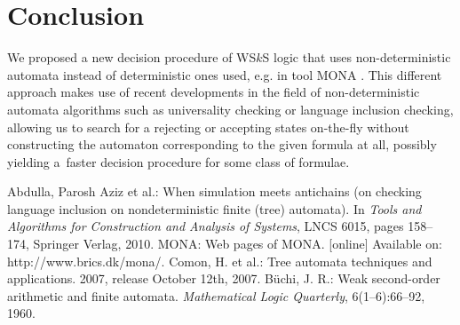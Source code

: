 \documentclass{eeict}
\begin{document}
\section{Conclusion}

We proposed a new decision procedure of WS$k$S logic that uses non-deterministic
automata instead of deterministic ones used, e.g. in tool
MONA \cite{mona}. This different approach makes use of recent developments in
the field of non-deterministic automata algorithms such as universality
checking or language inclusion checking, allowing us to search for a rejecting or accepting
states on-the-fly without constructing the automaton corresponding to the given
formula at all, possibly yielding a~faster decision procedure for some class of formulae.

\begin{thebibliography}{9}
Abdulla, Parosh Aziz et al.: When simulation meets
antichains (on checking language inclusion on nondeterministic finite (tree) automata). In
  \emph{Tools and Algorithms for Construction and Analysis of Systems}, LNCS
  6015, pages 158--174, Springer Verlag, 2010.
  MONA:
  Web pages of MONA.
  [online] Available on:
  http://www.brics.dk/mona/.
  Comon, H. et al.: Tree automata techniques and applications.
  2007, release October 12th, 2007.
  Büchi, J. R.: Weak second-order arithmetic and finite automata.
  \emph{Mathematical Logic Quarterly}, 6(1--6):66--92, 1960.
\end{thebibliography}
\end{document}
